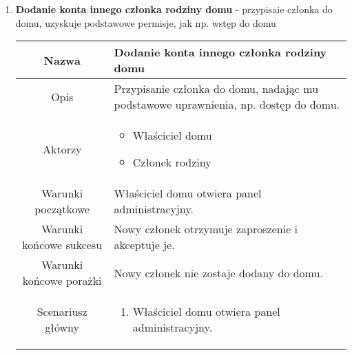 \documentclass{article}
\begin{document}
\begin{enumerate}
\begin{enumerate}
			\item \textbf{Dodanie konta innego członka rodziny domu} - przypisaie
				członka do domu, uzyskuje podstawowe permisje, jak np. wstęp do domu
				\begin{table}[H]
					\centering
					\begin{tabular}{|c|p{7cm}|}
						\hline
						Nazwa                   & \textbf{Dodanie konta innego członka rodziny domu}                                                                                                                                                                                                                \\
						\hline
						Opis                    & Przypisanie członka do domu, nadając mu podstawowe uprawnienia, np. dostęp do domu.                                                                                                                                                                               \\
						\hline
						Aktorzy                 & \begin{itemize}\item Właściciel domu

\item Członek rodziny\end{itemize}                                                                                                                                                                                          \\
						\hline
						Warunki początkowe      & Właściciel domu otwiera panel administracyjny.                                                                                                                                                                                                                    \\
						\hline
						Warunki końcowe sukcesu & Nowy członek otrzymuje zaproszenie i akceptuje je.                                                                                                                                                                                                                \\
						\hline
						Warunki końcowe porażki & Nowy członek nie zostaje dodany do domu.                                                                                                                                                                                                                          \\
						\hline
						Scenariusz główny       & \begin{enumerate}\item Właściciel domu otwiera panel administracyjny.


\end{enumerate}
\end{tabular}
\end{table}
\end{enumerate}
\end{enumerate}
\end{document}

